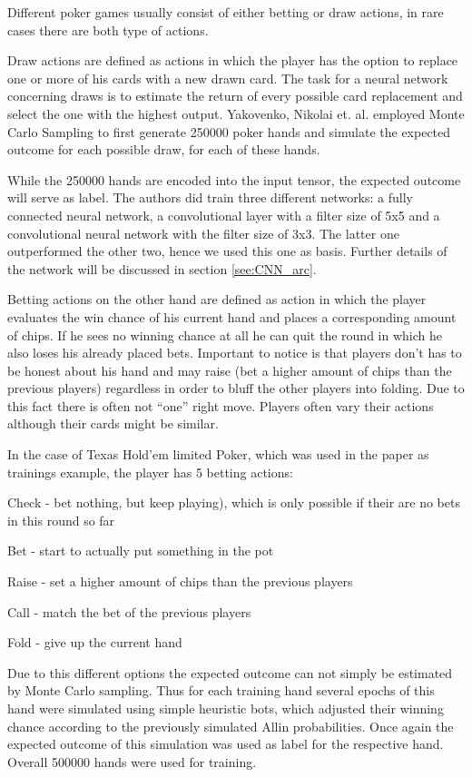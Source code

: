 \documentclass[]{report}
\begin{document}
Different poker games usually consist of either betting or draw actions,
in rare cases there are both type of actions. 

Draw actions are defined as actions in which the player has the option
to replace one or more of his cards with a new drawn card. The task
for a neural network concerning draws is to estimate the return of
every possible card replacement and select the one with the highest
output. Yakovenko, Nikolai et. al. employed Monte Carlo Sampling to
first generate 250000 poker hands and simulate the expected outcome
for each possible draw, for each of these hands.

While the 250000 hands are encoded into the input tensor, the expected
outcome will serve as label. The authors did train three different
networks: a fully connected neural network, a convolutional layer
with a filter size of 5x5 and a convolutional neural network with
the filter size of 3x3. The latter one outperformed the other two,
hence we used this one as basis. Further details of the network will
be discussed in section \ref{see:CNN_arc}. 

Betting actions on the other hand are defined as action in which the
player evaluates the win chance of his current hand and places a corresponding
amount of chips. If he sees no winning chance at all he can quit the
round in which he also loses his already placed bets. Important to
notice is that players don't has to be honest about his hand and may
raise (bet a higher amount of chips than the previous players) regardless
in order to bluff the other players into folding. Due to this fact
there is often not ``one'' right move. Players often vary their
actions although their cards might be similar. 

In the case of Texas Hold'em limited Poker, which was used in the
paper as trainings example, the player has 5 betting actions:

Check - bet nothing, but keep playing), which is only possible if
their are no bets in this round so far

Bet - start to actually put something in the pot

Raise - set a higher amount of chips than the previous players

Call - match the bet of the previous players

Fold - give up the current hand

Due to this different options the expected outcome can not simply
be estimated by Monte Carlo sampling. Thus for each training hand
several epochs of this hand were simulated using simple heuristic
bots, which adjusted their winning chance according to the previously
simulated Allin probabilities. Once again the expected outcome of
this simulation was used as label for the respective hand. Overall
500000 hands were used for training. 
\end{document}
